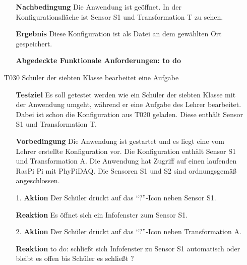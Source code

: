 \documentclass[parskip=full]{scrartcl}
\begin{document}
\begin{itemize}
\begin{itemize}
\item []\textbf{Nachbedingung} Die Anwendung ist geöffnet. In der Konfigurationsfläche ist Sensor S1 und Transformation T zu sehen. 
\item []\textbf{Ergebnis} Diese Konfiguration ist als Datei an dem gewählten Ort gespeichert.

\item []\textbf{Abgedeckte Funktionale Anforderungen: to do}

\end{itemize}

\item[T030] Schüler der siebten Klasse bearbeitet eine Aufgabe
\begin{itemize}

\item []\textbf{Testziel} Es soll getestet werden wie ein Schüler der siebten Klasse mit der Anwendung umgeht, während er eine Aufgabe des Lehrer bearbeitet. Dabei ist schon die Konfiguration aus T020 geladen. Diese enthält Sensor S1 und Transformation T.

\item []\textbf{Vorbedingung} Die Anwendung ist gestartet und es liegt eine vom Lehrer erstellte Konfiguration vor. Die Konfiguration enthält Sensor S1 und Transformation A. Die Anwendung hat Zugriff auf einen laufenden \gls{RasPi} Pi mit \gls{PhyPiDAQ}. Die Sensoren S1 und S2 sind ordnungsgemäß angeschlossen.
\item [1.]\textbf{Aktion} Der Schüler drückt auf das "`?"'-Icon neben Sensor S1.
\item []\textbf{Reaktion} Es öffnet sich ein Infofenster zum Sensor S1.
\item [2.]\textbf{Aktion} Der Schüler drückt auf das "`?"'-Icon neben Transformation A.

\item []\textbf{Reaktion} to do: schließt sich Infofenster zu Sensor S1 automatisch oder bleibt es offen bis Schüler es schließt ?


\end{itemize}
\end{itemize}
\end{document}
